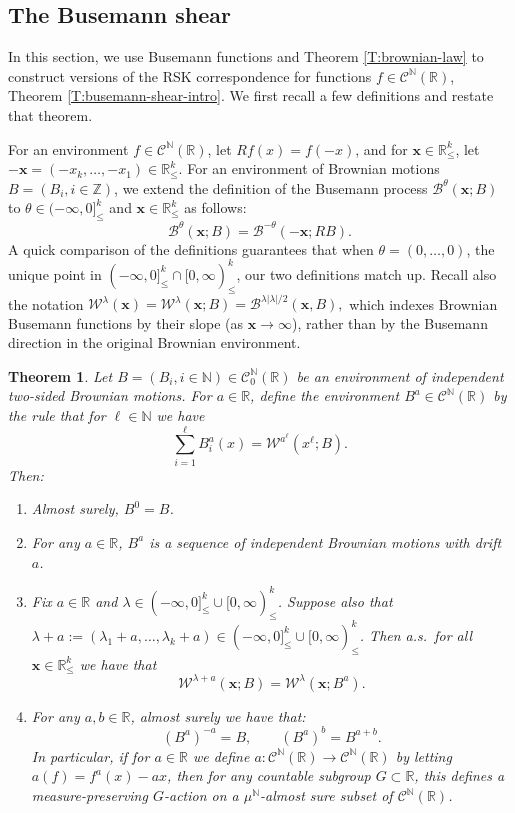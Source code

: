 \documentclass[11pt]{article}
\newcommand{\Z}{\mathbb{Z}}
\newcommand{\N}{\mathbb{N}}
\newcommand{\R}{\mathbb{R}}
\newcommand{\la}{\lambda}
\newcommand{\cB}{\mathcal{B}}
\newcommand{\cC}{\mathcal{C}}
\newcommand{\cW}{\mathcal{W}}
\newcommand{\bx}{\mathbf{x}}
\newtheorem{theorem}{Theorem}[section]
\theoremstyle{definition} %
\theoremstyle{remark} %
\begin{document}
\subsection{The Busemann shear}
\label{S:multi-path-Busemann}

In this section, we use Busemann functions and Theorem \ref{T:brownian-law} to construct versions of the RSK correspondence for functions $f \in \cC^\N(\R)$, Theorem \ref{T:busemann-shear-intro}. We first recall a few definitions and restate that theorem.

For an environment $f \in \cC^\N(\R)$, let $Rf(x) = f(-x)$, and for $\bx \in \R^k_\le$, let $- \bx = (-x_k, \dots, -x_1) \in \R^k_\le$. For an environment of Brownian motions $B = (B_i, i \in \Z)$, we extend the definition of the Busemann process $\cB^\theta(\bx; B)$ to $\theta \in (-\infty, 0]^k_\le$ and $\bx \in \R^k_\le$ as follows:
\begin{equation}
	\label{E:conjugate-B}
\cB^\theta(\bx ; B) = \cB^{-\theta}(-\bx ; R B). 
\end{equation}
A quick comparison of the definitions guarantees that when $\theta = (0, \dots, 0)$, the unique point in $(-\infty, 0]^k_\le \cap [0, \infty)^k_\le$, our two definitions match up. Recall also the notation
$
\cW^\la(\bx) = \cW^\la(\bx; B) = \cB^{\la|\la|/2}(\bx, B),
$
which indexes Brownian Busemann functions by their slope (as $\bx \to \infty$), rather than by the Busemann direction in the original Brownian environment. 
\begin{theorem}
	\label{T:Busemann-shear}
	Let $B = (B_i, i \in \N) \in \cC^\N_0(\R)$ be an environment of independent two-sided Brownian motions. For $a \in \R$, define the environment $B^a \in \cC^\N(\R)$ by the rule that for $\ell \in \N$ we have
	$$
	\sum_{i=1}^\ell B^a_i(x) = \cW^{a^\ell}(x^\ell ; B).
	$$
	Then:
	\begin{enumerate}
		\item Almost surely, $B^0 = B$.
		\item For any $a \in \R$, $B^a$ is a sequence of independent Brownian motions with drift $a$. 
		\item Fix $a \in \R$ and $\la \in (-\infty, 0]^k_\le \cup [0, \infty)^k_\le$. Suppose also that $\la + a := (\la_1 + a, \dots, \la_k + a)\in (-\infty, 0]^k_\le \cup [0, \infty)^k_\le$. Then a.s.\ for all $\bx \in \R^k_\le$ we have that
		\begin{equation}
			\label{E:W-la-B-identity}
	\cW^{\la + a}(\bx; B) = \cW^{\la}(\bx; B^a).
		\end{equation}
		\item For any $a, b \in \R$, almost surely we have that: 
		\begin{equation}
			\label{E:Ba-a}
	(B^a)^{-a} = B, \qquad (B^a)^b = B^{a + b}.
		\end{equation}
		In particular, if for $a \in \R$ we define $a:\cC^\N(\R) \to \cC^\N(\R)$ by letting $a(f) = f^a(x) - ax$, then for any countable subgroup $G \subset \R$, this defines a measure-preserving $G$-action on a $\mu^\N$-almost sure subset of $\cC^\N(\R)$.
	\end{enumerate}
\end{theorem}
\end{document}
